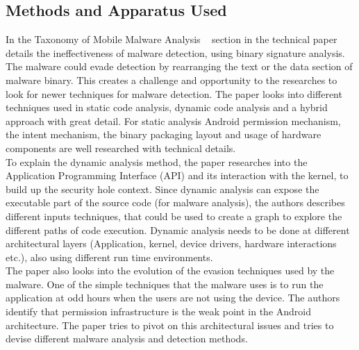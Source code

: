 \documentclass[12pt]{article}
\begin{document}
\subsection{Methods and Apparatus Used}\label{ref:paper_method}
In the Taxonomy of Mobile Malware Analysis ~\cite{Tam:2017:EAM:3022634.3017427} section in the technical paper details the ineffectiveness of malware detection, using binary signature analysis. The malware could evade detection by rearranging the text or the data section of malware binary. This creates a challenge and opportunity to the researches to look for newer techniques for malware detection. The paper looks into different techniques used in static code analysis, dynamic code analysis and a hybrid approach with great detail. For static analysis Android permission mechanism, the intent mechanism, the binary packaging layout and usage of hardware components are well researched with technical details. \\
To explain the dynamic analysis method, the paper researches into the Application Programming Interface (API) and its interaction with the kernel, to build up the security hole context. Since dynamic analysis can expose the executable part of the source code (for malware analysis), the authors describes different inputs techniques, that could be used to create a graph to explore the different paths of code execution. Dynamic analysis needs to be done at different architectural layers (Application, kernel, device drivers, hardware interactions etc.), also using different run time environments. \\
The paper also looks into the evolution of the evasion techniques used by the malware. One of the simple techniques that the malware uses is to run the application at odd hours when the users are not using the device. The authors identify that permission infrastructure is the weak point in the Android architecture. The paper tries to pivot on this architectural issues and tries to devise different malware analysis and detection methods.
\end{document}
